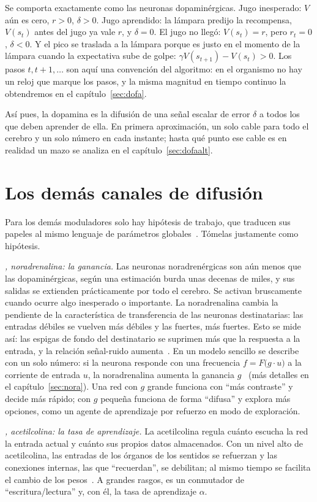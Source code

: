 Se comporta exactamente como las neuronas dopaminérgicas. Jugo inesperado: $V$ aún es cero, $r>0$, $\delta>0$. Jugo aprendido: la lámpara predijo la recompensa, $V(s_t)$ antes del jugo ya vale $r$, y $\delta=0$. El jugo no llegó: $V(s_t)=r$, pero $r_t=0$, $\delta<0$. Y el pico se traslada a la lámpara porque es justo en el momento de la lámpara cuando la expectativa sube de golpe: $\gamma V(s_{t+1})-V(s_t)>0$. Los pasos $t,t+1,\dots$ son aquí una convención del algoritmo: en el organismo no hay un reloj que marque los pasos, y la misma magnitud en tiempo continuo la obtendremos en el capítulo~\ref{sec:dofa}.

Así pues, la dopamina es la difusión de una señal escalar de error $\delta$ a todos los que deben aprender de ella. En primera aproximación, un solo cable para todo el cerebro y un solo número en cada instante; hasta qué punto ese cable es en realidad un mazo se analiza en el capítulo~\ref{sec:dofaalt}.

\section{Los demás canales de difusión}

Para los demás moduladores solo hay hipótesis de trabajo, que traducen sus papeles al mismo lenguaje de parámetros globales~\cite{Doya2002}. Tómelas justamente como hipótesis.

\emph{, noradrenalina: la ganancia.} Las neuronas noradrenérgicas son aún menos que las dopaminérgicas, según una estimación burda unas decenas de miles, y sus salidas se extienden prácticamente por todo el cerebro. Se activan bruscamente cuando ocurre algo inesperado o importante. La noradrenalina cambia la pendiente de la característica de transferencia de las neuronas destinatarias: las entradas débiles se vuelven más débiles y las fuertes, más fuertes. Esto se mide así: las espigas de fondo del destinatario se suprimen más que la respuesta a la entrada, y la relación señal-ruido aumenta~\cite{Foote1975NE}. En un modelo sencillo se describe con un solo número: si la neurona responde con una frecuencia $f=F\bigl(g\cdot u\bigr)$ a la corriente de entrada $u$, la noradrenalina aumenta la ganancia $g$~\cite{AstonJones2005} (más detalles en el capítulo~\ref{sec:nora}). Una red con $g$ grande funciona con “más contraste” y decide más rápido; con $g$ pequeña funciona de forma “difusa” y explora más opciones, como un agente de aprendizaje por refuerzo en modo de exploración.

\emph{, acetilcolina: la tasa de aprendizaje.} La acetilcolina regula cuánto escucha la red la entrada actual y cuánto sus propios datos almacenados. Con un nivel alto de acetilcolina, las entradas de los órganos de los sentidos se refuerzan y las conexiones internas, las que “recuerdan”, se debilitan; al mismo tiempo se facilita el cambio de los pesos~\cite{Hasselmo2006}. A grandes rasgos, es un conmutador de “escritura/lectura” y, con él, la tasa de aprendizaje $\alpha$.

